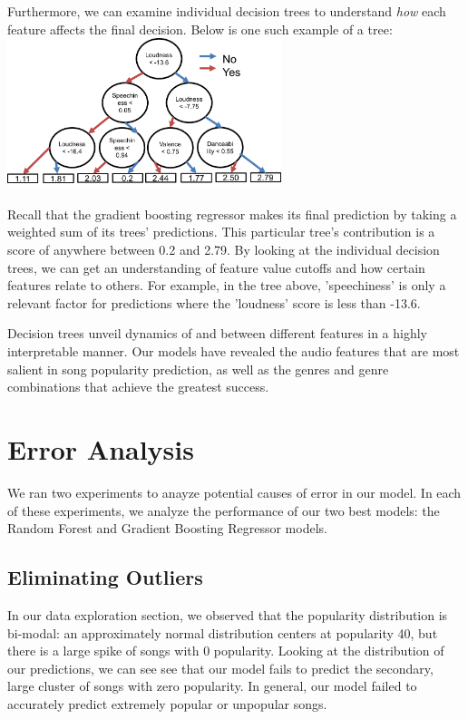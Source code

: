 \documentclass[journal]{IEEEtran}
\begin{document}
Furthermore, we can examine individual decision trees to understand \textit{how} each feature affects the final decision. Below is one such example of a tree: \\

\includegraphics[width=8cm]{images/gbm_example_tree.png}

\quad\newline
Recall that the gradient boosting regressor makes its final prediction by taking a weighted sum of its trees' predictions. This particular tree's contribution is a score of anywhere between 0.2 and 2.79. By looking at the individual decision trees, we can get an understanding of feature value cutoffs and how certain features relate to others. For example, in the tree above, 'speechiness' is only a relevant factor for predictions where the 'loudness' score is less than -13.6.

Decision trees unveil dynamics of and between different features in a highly interpretable manner. Our models have revealed the audio features that are most salient in song popularity prediction, as well as the genres and genre combinations that achieve the greatest success.

\section{Error Analysis}

We ran two experiments to anayze potential causes of error in our model. In each of these experiments, we analyze the performance of our two best models: the Random Forest and Gradient Boosting Regressor models.

\subsection{Eliminating Outliers}
In our data exploration section, we observed that the popularity distribution is bi-modal: an approximately normal distribution centers at popularity 40, but there is a large spike of songs with 0 popularity. Looking at the distribution of our predictions, we can see see that our model fails to predict the secondary, large cluster of songs with zero popularity. In general, our model failed to accurately predict extremely popular or unpopular songs.
\end{document}
